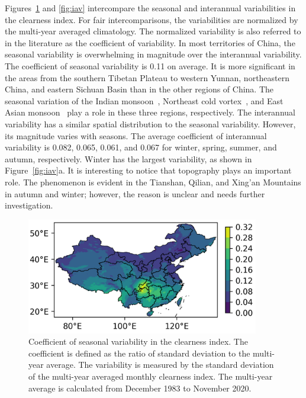 \documentclass[atmosphere,article,accept,pdftex,moreauthors]{Definitions/mdpi}
\begin{document}
Figures~\ref{fig:szv} and \ref{fig:iav} intercompare the seasonal and interannual variabilities in the clearness index. For fair intercomparisons, the variabilities are normalized by the multi-year averaged climatology. The normalized variability is also referred to in the literature as the coefficient of variability. In most territories of China, the seasonal variability is overwhelming in magnitude over the interannual variability. The coefficient of seasonal variability is 0.11 on average. It is more significant in the areas from the southern Tibetan Plateau to western Yunnan, northeastern China, and eastern Sichuan Basin than in the other regions of China. The seasonal variation of the Indian monsoon~\cite{hrudya2021MAP}, Northeast cold vortex~\cite{wu2021ESS}, and East Asian monsoon~\cite{ding2005MAP} play a role in these three regions, respectively. The interannual variability has a similar spatial distribution to the seasonal variability. However, its magnitude varies with seasons. The average coefficient of interannual variability is 0.082, 0.065, 0.061, and 0.067 for winter, spring, summer, and autumn, respectively. Winter has the largest variability, as shown in Figure~\ref{fig:iav}a. It is interesting to notice that topography plays an important role. The phenomenon is evident in the Tianshan, Qilian, and Xing'an Mountains in autumn and winter; however, the reason is unclear and needs further investigation.

\begin{figure}[H]
  \includegraphics[width=10.16cm]{fig/szv.png}
  \caption{Coefficient of seasonal variability in the clearness index. The coefficient is defined as the ratio of standard deviation to the multi-year average. The variability is measured by the standard deviation of the multi-year averaged monthly clearness index. The multi-year average is calculated from December 1983 to November 2020. \label{fig:szv}}
\end{figure}
\end{document}
